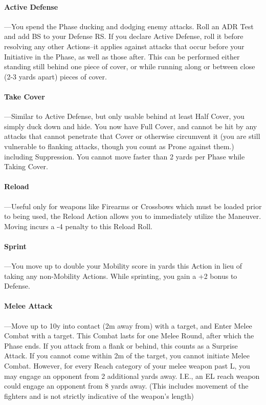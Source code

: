 \documentclass[oneside,11pt,english]{book}
\begin{document}
\paragraph{\label{par:Active Defense:} Active Defense}
---\quad You spend the Phase ducking and dodging enemy attacks. Roll an ADR Test
and add BS to your Defense RS. If you declare Active Defense, roll it before
resolving any other Actions--it applies against attacks that occur before your
Initiative in the Phase, as well as those after. This can be performed either
standing still behind one piece of cover, or while running along or between
close (2-3 yards apart) pieces of cover.

\paragraph{\label{par:Take Cover} Take Cover}
---\quad Similar to Active Defense, but only usable behind at least Half Cover,
you simply duck down and hide. You now have Full Cover, and cannot be hit by any
attacks that cannot penetrate that Cover or otherwise circumvent it (you are
still vulnerable to flanking attacks, though you count as Prone against them.)
including Suppression. You cannot move faster than 2 yards per Phase while
Taking Cover.

\paragraph{\label{par:Reload}Reload}
---\quad Useful only for weapons like Firearms or Crossbows which must be loaded
prior to being used, the Reload Action allows you to immediately utilize the
 Maneuver. Moving incurs a -4 penalty to this Reload Roll.  

\paragraph{\label{par:Sprint} Sprint}
---\quad You move up to double your Mobility score in yards this Action in lieu
of taking any non-Mobility Actions. While sprinting, you gain a +2 bonus to
Defense.

\paragraph{\label{par:Melee Attack} Melee Attack}
---\quad Move up to 10y into contact (2m away from) with a target, and Enter
Melee Combat with a target. This Combat lasts for one Melee Round, after which
the Phase ends. If you attack from a flank or behind, this counts as a Surprise
Attack. If you cannot come within 2m of the target, you cannot initiate Melee
Combat. However, for every Reach category of your melee weapon past L, you may
engage an opponent from 2 additional yards away. I.E., an EL reach weapon could
engage an opponent from 8 yards away. (This includes movement of the fighters
and is not strictly indicative of the weapon’s length)
\end{document}
